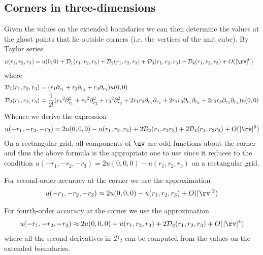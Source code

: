\documentclass[10pt]{article}
\newcommand{\Ds}{{\mathcal D}}%
\newcommand{\ra}{{r_1}}%
\newcommand{\rb}{{r_2}}%
\newcommand{\rc}{{r_3}}%
\begin{document}

\clearpage
\subsection{Corners in three-dimensions}


Given the values on the extended boundaries we can then determine the 
values at the ghost points that lie outside corners (i.e. the vertices of the unit cube).
By Taylor series
\begin{align*}
  u(\ra,\rb,\rc)&= u(0,0) + \Ds_1(\ra,\rb,\rc) + \Ds_2(\ra,\rb,\rc) + \Ds_3(\ra,\rb,\rc) + \Ds_4(\ra,\rb,\rc) + \trunc
\end{align*}
where
\begin{align*}
  \Ds_1(\ra,\rb,\rc) &= (\ra \partial_\ra + \rb \partial_\rb + \rc \partial_\rc ) u(0,0) \\
  \Ds_2(\ra,\rb,\rc) &= {1\over2!}( \ra^2\partial_\ra^2+\rb^2\partial_\rb^2 +\rc^2\partial_\rc^2
                         + 2\ra\rb\partial_\ra\partial_\rb 
                         + 2\ra\rc\partial_\ra\partial_\rc + 2\rb\rc\partial_\rb\partial_\rc 
                     )u(0,0)  \\
\end{align*}
Whence we derive the expression
\begin{align}
 u(-\ra,-\rb,-\rc) &= 2 u(0,0,0) - u(\ra,\rb,\rc) + 2\Ds_2(\ra,\rb\rc) + 2\Ds_4(\ra,\rb\rc)+ \trunc \label{taylor1} \\
\end{align}
On a rectangular grid, all components of $\uv$ are odd functions about the corner and thus
the above formula is the appropriate one to use since it reduces to the condition
$u(-\ra,-\rb,-\rc) = 2 u(0,0,0) - u(\ra,\rb,\rc)$ on a rectangular grid.

For second-order accuracy at the corner we use the approximation
\begin{align}
   u(-\ra,-\rb,-\rc) &\approx 2 u(0,0,0) - u(\ra,\rb,\rc) + \trunca \\
\end{align}

For fourth-order accuracy  at the corner we use the approximation
\begin{align}
   u(-\ra,-\rb,-\rc) &\approx 2 u(0,0,0) - u(\ra,\rb,\rc) + 2\Ds_2(\ra,\rb,\rc) + \truncb \\
\end{align}
where all the second derivatives in $\Ds_2$ can be computed from the values on the extended boundaries.
\end{document}
